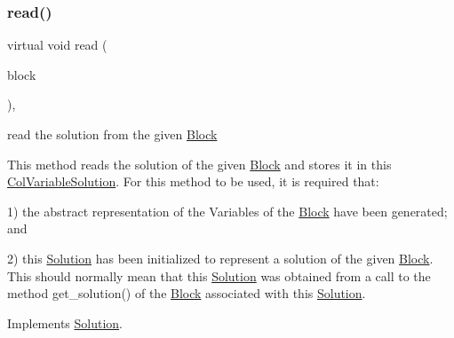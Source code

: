 \subsubsection{\texorpdfstring{read()}{read()}}
{\footnotesize\ttfamily virtual void read (\begin{DoxyParamCaption}\item[{const \mbox{\hyperlink{class_s_m_spp__di__unipi__it_1_1_block}{Block}} $\ast$const}]{block }\end{DoxyParamCaption})\hspace{0.3cm}{\ttfamily [override]}, {\ttfamily [virtual]}}



read the solution from the given \mbox{\hyperlink{class_s_m_spp__di__unipi__it_1_1_block}{Block}} 

This method reads the solution of the given \mbox{\hyperlink{class_s_m_spp__di__unipi__it_1_1_block}{Block}} and stores it in this \mbox{\hyperlink{class_s_m_spp__di__unipi__it_1_1_col_variable_solution}{Col\+Variable\+Solution}}. For this method to be used, it is required that\+:

1) the abstract representation of the Variables of the \mbox{\hyperlink{class_s_m_spp__di__unipi__it_1_1_block}{Block}} have been generated; and

2) this \mbox{\hyperlink{class_s_m_spp__di__unipi__it_1_1_solution}{Solution}} has been initialized to represent a solution of the given \mbox{\hyperlink{class_s_m_spp__di__unipi__it_1_1_block}{Block}}. This should normally mean that this \mbox{\hyperlink{class_s_m_spp__di__unipi__it_1_1_solution}{Solution}} was obtained from a call to the method get\+\_\+solution() of the \mbox{\hyperlink{class_s_m_spp__di__unipi__it_1_1_block}{Block}} associated with this \mbox{\hyperlink{class_s_m_spp__di__unipi__it_1_1_solution}{Solution}}. 

Implements \mbox{\hyperlink{class_s_m_spp__di__unipi__it_1_1_solution_ae22668fc6d3d5794e6a881953898aa6b}{Solution}}.

\mbox{\label{class_s_m_spp__di__unipi__it_1_1_col_variable_solution_ae540e7cdfd7d10111ae795606dfa58e2}} 
